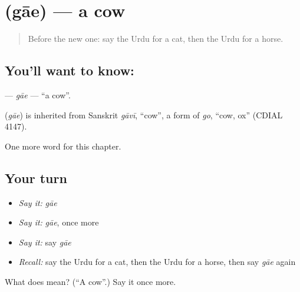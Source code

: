 \section[\texorpdfstring{\ur{گائے} (gāe)}{گائے (gāe)}]{ (gāe) — a cow}

\label{lesson:UR-C67-gae}



\begin{quote}
Before the new one: say the Urdu for a cat, then the Urdu for a horse.
\end{quote}

\subsection*{You'll want to know: }
\textbf{} — \emph{gāe} — \textquotedblleft{}a cow\textquotedblright{}.

\begin{cousinweb}
\textbf{} (\emph{gāe}) is inherited from Sanskrit \emph{gāvī}, \textquotedblleft{}cow\textquotedblright{}, a form of \emph{go}, \textquotedblleft{}cow, ox\textquotedblright{} (CDIAL 4147).
\end{cousinweb}

\begin{grammarlens}[title={What you've built}]
One more word for this chapter.
\end{grammarlens}

\subsection*{Your turn}
\begin{itemize}
\raggedright
  \item \emph{Say it:} \emph{gāe}
  \item \emph{Say it:} \emph{gāe}, once more
  \item \emph{Say it:} say \emph{gāe}
  \item \emph{Recall:} say the Urdu for a cat, then the Urdu for a horse, then say \emph{gāe} again
\end{itemize}

\begin{tcolorbox}[breakable,colback=teal!4,colframe=teal!35!black,title={Before you move on}]
What does  mean? (\textquotedblleft{}A cow\textquotedblright{}.) Say it once more.
\end{tcolorbox}
